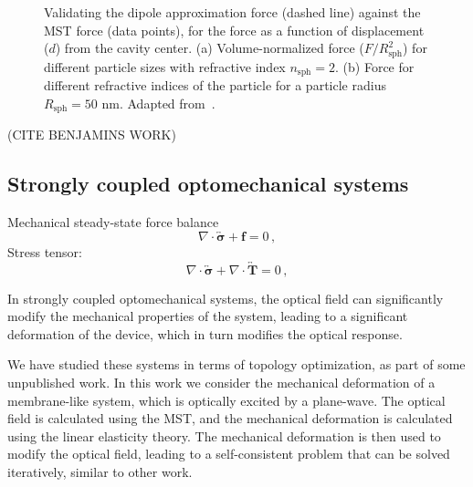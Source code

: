 \begin{figure}[tb]
    \centering
    \caption{Validating the dipole approximation force (dashed line) against the MST force (data points), for the force as a function of displacement ($d$) from the cavity center.
    (a) Volume-normalized force ($F/R^2_\text{sph}$) for different particle sizes with refractive index $n_\text{sph}=2$. (b) Force for different refractive indices of the particle for a particle radius $R_\text{sph}=50$ nm. Adapted from~\cite{ownpub3}.}
    \label{fig:SPIE}
\end{figure}

(CITE BENJAMINS WORK)

\subsection*{Strongly coupled optomechanical systems}

Mechanical steady-state force balance
\begin{equation}
    \nabla \cdot \overleftrightarrow{\boldsymbol{\sigma}} + \mathbf{f} = 0\,,
\end{equation}
Stress tensor:
\begin{equation}
    \nabla \cdot \overleftrightarrow{\boldsymbol{\sigma}} + \nabla \cdot \overleftrightarrow{\mathbf{T}} = 0\,,
\end{equation}

In strongly coupled optomechanical systems, the optical field can significantly modify the mechanical properties of the system, leading to a significant deformation
of the device, which in turn modifies the optical response. 

We have studied these systems in terms of topology optimization, as part of some unpublished work. In this work we consider 
the mechanical deformation of a membrane-like system, which is optically excited by a plane-wave. The optical field is calculated using the MST,
and the mechanical deformation is calculated using the linear elasticity theory. The mechanical deformation is then used to modify the optical field, 
leading to a self-consistent problem that can be solved iteratively, similar to other work.

